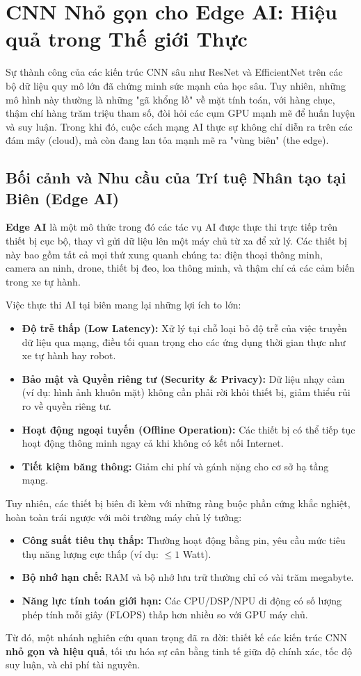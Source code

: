 \section{CNN Nhỏ gọn cho Edge AI: Hiệu quả trong Thế giới Thực}
\label{sec:compact_cnns_for_edge_ai}

Sự thành công của các kiến trúc CNN sâu như ResNet và EfficientNet trên các bộ dữ liệu quy mô lớn đã chứng minh sức mạnh của học sâu. Tuy nhiên, những mô hình này thường là những "gã khổng lồ" về mặt tính toán, với hàng chục, thậm chí hàng trăm triệu tham số, đòi hỏi các cụm GPU mạnh mẽ để huấn luyện và suy luận. Trong khi đó, cuộc cách mạng AI thực sự không chỉ diễn ra trên các đám mây (cloud), mà còn đang lan tỏa mạnh mẽ ra "vùng biên" (the edge).

\subsection{Bối cảnh và Nhu cầu của Trí tuệ Nhân tạo tại Biên (Edge AI)}
\label{subsec:edge_ai_context}
\textbf{Edge AI} là một mô thức trong đó các tác vụ AI được thực thi trực tiếp trên thiết bị cục bộ, thay vì gửi dữ liệu lên một máy chủ từ xa để xử lý. Các thiết bị này bao gồm tất cả mọi thứ xung quanh chúng ta: điện thoại thông minh, camera an ninh, drone, thiết bị đeo, loa thông minh, và thậm chí cả các cảm biến trong xe tự hành.

Việc thực thi AI tại biên mang lại những lợi ích to lớn:
\begin{itemize}
	\item \textbf{Độ trễ thấp (Low Latency):} Xử lý tại chỗ loại bỏ độ trễ của việc truyền dữ liệu qua mạng, điều tối quan trọng cho các ứng dụng thời gian thực như xe tự hành hay robot.
	\item \textbf{Bảo mật và Quyền riêng tư (Security \& Privacy):} Dữ liệu nhạy cảm (ví dụ: hình ảnh khuôn mặt) không cần phải rời khỏi thiết bị, giảm thiểu rủi ro về quyền riêng tư.
	\item \textbf{Hoạt động ngoại tuyến (Offline Operation):} Các thiết bị có thể tiếp tục hoạt động thông minh ngay cả khi không có kết nối Internet.
	\item \textbf{Tiết kiệm băng thông:} Giảm chi phí và gánh nặng cho cơ sở hạ tầng mạng.
\end{itemize}

Tuy nhiên, các thiết bị biên đi kèm với những ràng buộc phần cứng khắc nghiệt, hoàn toàn trái ngược với môi trường máy chủ lý tưởng:
\begin{itemize}
	\item \textbf{Công suất tiêu thụ thấp:} Thường hoạt động bằng pin, yêu cầu mức tiêu thụ năng lượng cực thấp (ví dụ: $\le 1$ Watt).
	\item \textbf{Bộ nhớ hạn chế:} RAM và bộ nhớ lưu trữ thường chỉ có vài trăm megabyte.
	\item \textbf{Năng lực tính toán giới hạn:} Các CPU/DSP/NPU di động có số lượng phép tính mỗi giây (FLOPS) thấp hơn nhiều so với GPU máy chủ.
\end{itemize}
Từ đó, một nhánh nghiên cứu quan trọng đã ra đời: thiết kế các kiến trúc CNN \textbf{nhỏ gọn và hiệu quả}, tối ưu hóa sự cân bằng tinh tế giữa độ chính xác, tốc độ suy luận, và chi phí tài nguyên.

